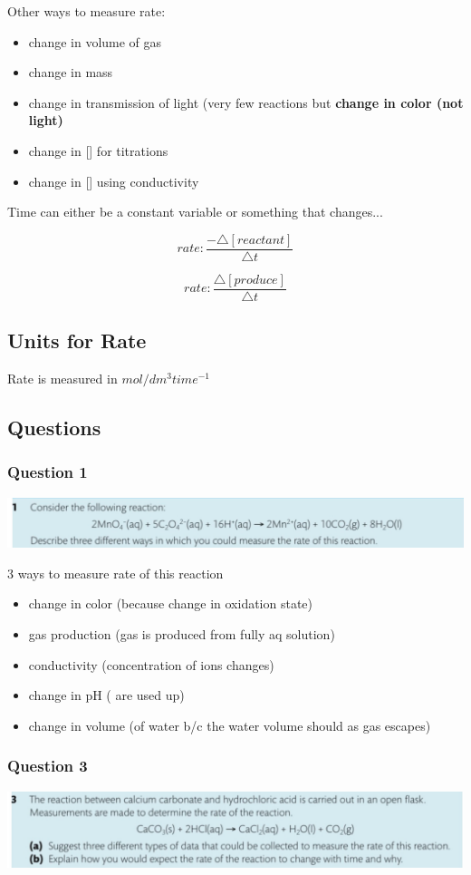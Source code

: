 \documentclass{article}
\begin{document}
Other ways to measure rate:
\begin{itemize}
\item change in volume of gas
\item change in mass
\item change in transmission of light (very few reactions but \textbf{change in color (not light)}
\item change in [] for titrations
\item change in [] using conductivity
\end{itemize}

Time can either be a constant variable or something that changes...


$$rate: \frac{-\triangle{[reactant]}}{\triangle{t}}$$

$$rate: \frac{\triangle{[produce]}}{\triangle{t}}$$


\subsection{Units for Rate}
Rate is measured in $mol/dm^{3}time^{-1}$


\subsection{Questions}
\subsubsection{Question 1}
\includegraphics[width=\textwidth]{2.1fig2.png}

3 ways to measure rate of this reaction
\begin{itemize}
\item change in color (because change in oxidation state)
\item gas production (gas is produced from fully aq solution)
\item conductivity (concentration of ions changes)
\item change in pH (\textbf{} are used up)
\item change in volume (of water b/c the water volume should  as gas escapes)
\end{itemize}


\subsubsection{Question 3}
\includegraphics[width=\textwidth]{2.1fig3.png}
\end{document}
